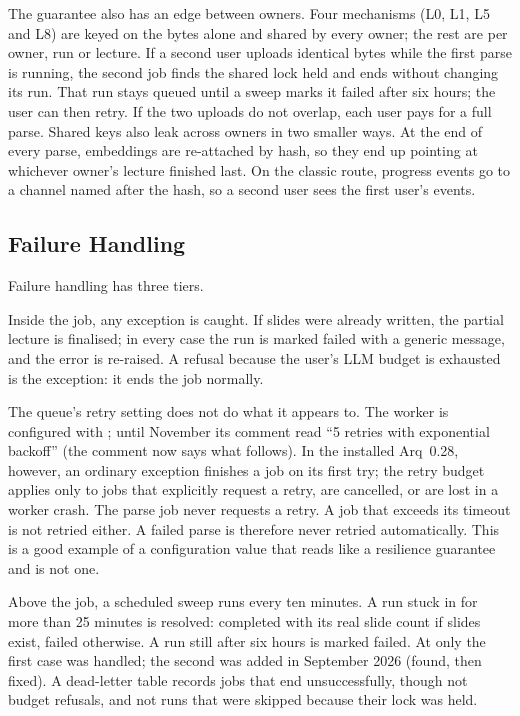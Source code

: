 The guarantee also has an edge between owners. Four mechanisms (L0, L1, L5 and
L8) are keyed on the bytes alone and shared by every owner; the rest are per
owner, run or lecture. If a second user uploads identical bytes while the first
parse is running, the second job finds the shared lock held and ends without
changing its run. That run stays queued until a sweep marks it failed after six
hours; the user can then retry. If the two uploads do not overlap, each user
pays for a full parse. Shared keys also leak across owners in two smaller
ways. At the end of every parse, embeddings are re-attached by hash, so they end
up pointing at whichever owner's lecture finished last. On the classic route,
progress events go to a channel named after the hash, so a second user sees
the first user's events.

\subsection{Failure Handling}
\label{sec:failure-handling}

Failure handling has three tiers.

Inside the job, any exception is caught. If slides were already written, the
partial lecture is finalised; in every case the run is marked failed with a
generic message, and the error is re-raised. A refusal because the user's LLM
budget is exhausted is the exception: it ends the job normally.

The queue's retry setting does not do what it appears to. The worker is
configured with ; until November its comment read
``5 retries with exponential backoff'' (the comment now says what follows). In
the installed Arq~0.28, however, an ordinary
exception finishes a job on its first try; the retry budget applies only to
jobs that explicitly request a retry, are cancelled, or are lost in a worker
crash. The parse job never requests a retry. A job that exceeds its timeout is
not retried either. A failed parse is therefore never retried automatically.
This is a good example of a configuration value that reads like a resilience
guarantee and is not one.

Above the job, a scheduled sweep runs every ten minutes. A run stuck in
 for more than 25 minutes is resolved: completed with its real
slide count if slides exist, failed otherwise. A run still  after
six hours is marked failed. At \code{\thesisEarlierCommit} only the first case was handled;
the second was added in September 2026 (found, then fixed). A dead-letter table
records jobs that end unsuccessfully, though not budget refusals, and not runs
that were skipped because their lock was held.

